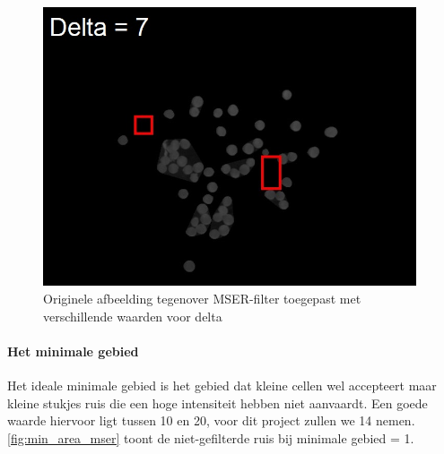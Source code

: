\documentclass{article}
\begin{document}
\begin{multicols}{2}
\begin{figure}[H]
\includegraphics[width=0.98\textwidth]{images/delta_7.jpg}
\caption{\label{fig:delta_mser}Originele afbeelding tegenover MSER-filter toegepast met verschillende waarden voor delta}
\end{figure}

\paragraph{Het minimale gebied}
Het ideale minimale gebied is het gebied dat kleine cellen wel accepteert maar kleine stukjes ruis die een hoge intensiteit hebben niet aanvaardt. Een goede waarde hiervoor ligt tussen 10 en 20, voor dit project zullen we 14 nemen. \autoref{fig:min_area_mser} toont de niet-gefilterde ruis bij minimale gebied = 1.


\end{multicols}
\end{document}
